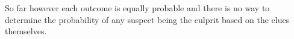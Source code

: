 So far however each outcome is equally probable and there is no way to determine the probability of any suspect being the culprit based on the clues themselves.







